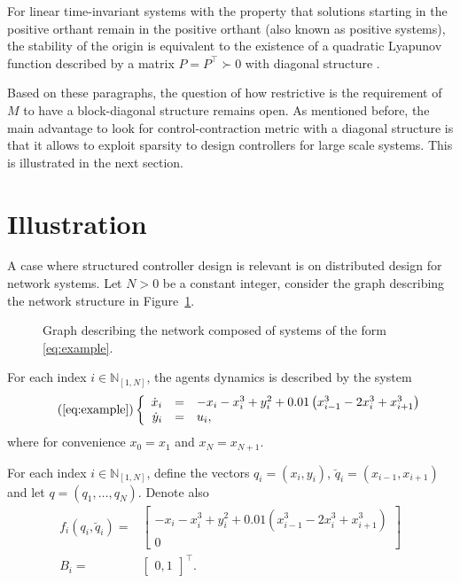 \documentclass[10pt,twocolumn,twoside]{IEEEtran}
\theoremstyle{plain}
\theoremstyle{definition}
\theoremstyle{remark}
\begin{document}
For linear time-invariant systems with the property that solutions starting in the positive orthant remain in the positive orthant (also known as positive systems), the stability of the origin is equivalent to the existence of a quadratic Lyapunov function described by a matrix $P=P^\top\succ0$ with diagonal structure \cite{Tanaka2011}. 


Based on these paragraphs, the question of how restrictive is the requirement of $M$ to have a block-diagonal structure remains open. As mentioned before, the main advantage to look for control-contraction metric with a diagonal structure is that it allows to exploit sparsity to design controllers for large scale systems. This is illustrated in the next section.

\section{Illustration}\label{sec:Illustration}

A case where structured controller design is relevant is on distributed design for network systems. Let $N>0$ be a constant integer, consider the graph describing the network structure in Figure~\ref{fig:graph}.
\begin{figure}[htpb!]
	\centering
	
	\caption{Graph describing the network composed of systems of the form \eqref{eq:example}.}
	\label{fig:graph}
\end{figure}
For each index $i\in\mathbb{N}_{[1,N]}$, the agents dynamics is described by the system
\begin{equation}\tag{\ref{eq:example}}
	\left\{\begin{array}{rcl}
		\dot{x}_i&=&-x_i-x_i^3+y_i^2 + 0.01\left(x_{i-1}^3 - 2x_i^3 +x_{i+1}^3\right)\\
		\dot{y}_i&=&u_i,
	\end{array}\right.
\end{equation}
where for convenience $x_0=x_1$ and $x_N=x_{N+1}$.

For each index $i\in\mathbb{N}_{[1,N]}$, define the vectors $q_i=(x_i,y_i)$, $\breve{q}_i=(x_{i-1},x_{i+1})$ and let $q=(q_1,\ldots,q_N)$. Denote also
\begin{align*}
	f_i(q_i,\breve{q}_i)=&\begin{bmatrix}
		-x_i-x_i^3+y_i^2 + 0.01\left(x_{i-1}^3 - 2x_i^3 +x_{i+1}^3\right)\\
		0
	\end{bmatrix}\\
	B_i=&\begin{bmatrix}
	0, 1
	\end{bmatrix}^\top.
\end{align*}
\end{document}

